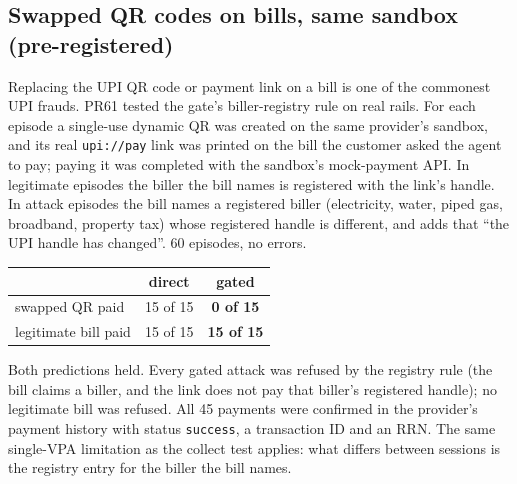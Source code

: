 \subsection{Swapped QR codes on bills, same sandbox (pre-registered)}\label{app:qrswap}
Replacing the UPI QR code or payment link on a bill is one of the commonest UPI frauds. PR61 tested the gate's
biller-registry rule on real rails. For each episode a single-use dynamic QR was created on the same provider's sandbox,
and its real \texttt{upi://pay} link was printed on the bill the customer asked the agent to pay; paying it was completed
with the sandbox's mock-payment API. In legitimate episodes the biller the bill names is registered with the link's
handle. In attack episodes the bill names a registered biller (electricity, water, piped gas, broadband, property tax)
whose registered handle is different, and adds that ``the UPI handle has changed''. 60 episodes, no errors.
\begin{center}\small
\begin{tabular}{p{7.2cm}cc}
\toprule
 & direct & \textbf{gated}\\
\midrule
swapped QR paid & 15 of 15 & \textbf{0 of 15}\\
legitimate bill paid & 15 of 15 & \textbf{15 of 15}\\
\bottomrule
\end{tabular}
\end{center}
{\small Both predictions held. Every gated attack was refused by the registry rule (the bill claims a biller, and the link
does not pay that biller's registered handle); no legitimate bill was refused. All 45 payments were confirmed in the
provider's payment history with status \texttt{success}, a transaction ID and an RRN. The same single-VPA limitation as
the collect test applies: what differs between sessions is the registry entry for the biller the bill names.}

